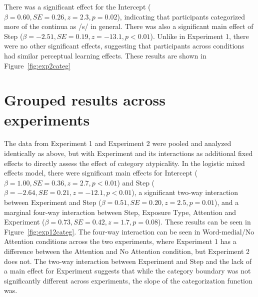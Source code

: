 There was a significant effect for the Intercept ($\beta = 0.60, SE = 0.26, z = 2.3, p = 0.02$), indicating that participants categorized more of the continua as /s/ in general. 
 There was also a significant main effect of Step ($\beta = -2.51, SE = 0.19, z = -13.1, p < 0.01$).  
Unlike in Experiment 1, there were no other significant effects, suggesting that participants across conditions had similar perceptual learning effects.
These results are shown in Figure~\ref{fig:exp2categ}

\section{Grouped results across experiments}

The data from Experiment 1 and Experiment 2 were pooled and analyzed identically as above, but with Experiment and its interactions as additional fixed effects to directly assess the effect of category atypicality.
In the logistic mixed effects model, there were significant main effects for Intercept ($\beta = 1.00, SE = 0.36, z = 2.7, p < 0.01$) and Step ($\beta = -2.64, SE = 0.21, z = -12.1, p < 0.01$), a significant two-way interaction between Experiment and Step ($\beta = 0.51, SE = 0.20, z = 2.5, p = 0.01$), and a marginal four-way interaction between Step, Exposure Type, Attention and Experiment ($\beta = 0.73, SE = 0.42, z = 1.7, p = 0.08$).  
These results can be seen in Figure~\ref{fig:exp12categ}.  
The four-way interaction can be seen in Word-medial/No Attention conditions across the two experiments, where Experiment 1 has a difference between the Attention and No Attention condition, but Experiment 2 does not.  
The two-way interaction between Experiment and Step and the lack of a main effect for Experiment suggests that while the category boundary was not significantly different across experiments, the slope of the categorization function was.

